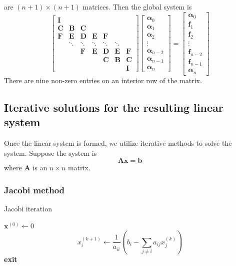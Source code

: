 \documentclass{article}
\begin{document}
are $(n+1) \times (n+1)$ matrices. Then the global system is
\begin{equation*}
    \begin{bmatrix}
    \bm I \\
    \bm C  & \bm B  & \bm C \\
    \bm F  & \bm E  & \bm D & \bm E & \bm F \\
          & \ddots & \ddots & \ddots & \ddots & \ddots \\ 
          &        & \bm F  & \bm E  & \bm D & \bm E & \bm F \\
          &        &               &             &   \bm C  & \bm B  & \bm C \\
          &        &               &             &              &    & \bm I
    \end{bmatrix}
    \begin{bmatrix}
    \bm\alpha_0 \\ \bm\alpha_1 \\ \bm\alpha_2 \\ \vdots \\ \bm\alpha_{n-2} \\ \bm\alpha_{n-1} \\ \bm\alpha_n
    \end{bmatrix}
    =
    \begin{bmatrix}
    \bm\alpha_0 \\ \bm f_1 \\ \bm f_2 \\ \vdots \\ \bm f_{n-2} \\ \bm f_{n-1} \\ \bm\alpha_n
    \end{bmatrix}    
\end{equation*}
There are nine non-zero entries on an interior row of the matrix.

\subsection{Iterative solutions for the resulting linear system}
Once the linear system is formed, we utilize iterative methods to solve the system. Suppose the system is
\begin{equation*}
    \bm{Ax} = \bm b
\end{equation*}
where $\bm A$ is an $n\times n$ matrix.

\subsubsection{Jacobi method}
\begin{algorithm}[H]
\caption{Jacobi iteration}
\begin{algorithmic}
\STATE $\bm x^{(0)} \leftarrow 0$
\STATE $$x_i^{(k+1)} \leftarrow \frac{1}{a_{ii}}\left(b_i - \sum_{j\ne i} a_{ij}x_j^{(k)}\right)$$
\STATE       \textbf{exit}
    \ENDIF
\ENDFOR
\end{algorithmic}
\end{algorithm}
\end{document}
